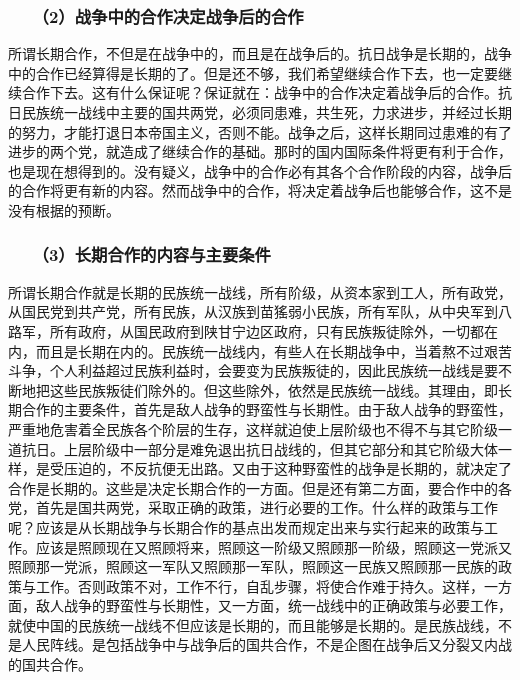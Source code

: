 \documentclass[cn,11pt,chinese]{elegantbook}
\def\myformat#1{\hfil\hfil #1}
\begin{document}
\subsubsection*{\myformat{　　（2）战争中的合作决定战争后的合作}}
所谓长期合作，不但是在战争中的，而且是在战争后的。抗日战争是长期的，战争中的合作已经算得是长期的了。但是还不够，我们希望继续合作下去，也一定要继续合作下去。这有什么保证呢？保证就在：战争中的合作决定着战争后的合作。抗日民族统一战线中主要的国共两党，必须同患难，共生死，力求进步，并经过长期的努力，才能打退日本帝国主义，否则不能。战争之后，这样长期同过患难的有了进步的两个党，就造成了继续合作的基础。那时的国内国际条件将更有利于合作，也是现在想得到的。没有疑义，战争中的合作必有其各个合作阶段的内容，战争后的合作将更有新的内容。然而战争中的合作，将决定着战争后也能够合作，这不是没有根据的预断。\\
\subsubsection*{\myformat{　　（3）长期合作的内容与主要条件}}
所谓长期合作就是长期的民族统一战线，所有阶级，从资本家到工人，所有政党，从国民党到共产党，所有民族，从汉族到苗猺弱小民族，所有军队，从中央军到八路军，所有政府，从国民政府到陕甘宁边区政府，只有民族叛徒除外，一切都在内，而且是长期在内的。民族统一战线内，有些人在长期战争中，当着熬不过艰苦斗争，个人利益超过民族利益时，会要变为民族叛徒的，因此民族统一战线是要不断地把这些民族叛徒们除外的。但这些除外，依然是民族统一战线。其理由，即长期合作的主要条件，首先是敌人战争的野蛮性与长期性。由于敌人战争的野蛮性，严重地危害着全民族各个阶层的生存，这样就迫使上层阶级也不得不与其它阶级一道抗日。上层阶级中一部分是难免退出抗日战线的，但其它部分和其它阶级大体一样，是受压迫的，不反抗便无出路。又由于这种野蛮性的战争是长期的，就决定了合作是长期的。这些是决定长期合作的一方面。但是还有第二方面，要合作中的各党，首先是国共两党，采取正确的政策，进行必要的工作。什么样的政策与工作呢？应该是从长期战争与长期合作的基点出发而规定出来与实行起来的政策与工作。应该是照顾现在又照顾将来，照顾这一阶级又照顾那一阶级，照顾这一党派又照顾那一党派，照顾这一军队又照顾那一军队，照顾这一民族又照顾那一民族的政策与工作。否则政策不对，工作不行，自乱步骤，将使合作难于持久。这样，一方面，敌人战争的野蛮性与长期性，又一方面，统一战线中的正确政策与必要工作，就使中国的民族统一战线不但应该是长期的，而且能够是长期的。是民族战线，不是人民阵线。是包括战争中与战争后的国共合作，不是企图在战争后又分裂又内战的国共合作。\\
\end{document}
